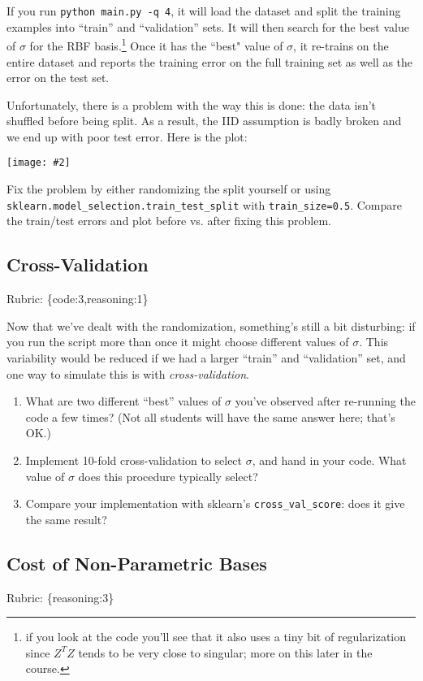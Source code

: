 \documentclass{article}
\def\rubric#1{\gre{Rubric: \{#1\}}}{}
\def\blu#1{{\color{blu}#1}}
\def\gre#1{{\color{gre}#1}}
\newcommand{\centerfig}[2]{\begin{center}\texttt{[image: \#2]}\end{center}}
\def\enum#1{\begin{enumerate}#1\end{enumerate}}
\begin{document}
If you run \verb|python main.py -q 4|, it will load the dataset and split the training examples
 into ``train'' and ``validation'' sets. It will then search for the best value of $\sigma$
 for the RBF basis.\footnote{if you look at the code you'll see that it also uses a tiny bit of regularization since $Z^TZ$ tends to be very close to singular; more on this later in the course.}
  Once it has the ``best" value of $\sigma$, it re-trains on the entire dataset and reports the
  training error on the full training set as well as the error on the test set.

Unfortunately, there is a problem with the way this is done: the data isn't shuffled before being split.
As a result, the IID assumption is badly broken and we end up with poor test error. Here is the plot:

\centerfig{.7}{../figs/least_squares_rbf_bad.pdf}


\blu{Fix the problem by either randomizing the split yourself or using \texttt{sklearn.model\_selection.train\_test\_split} with \texttt{train\_size=0.5}. Compare the train/test errors and plot before vs. after fixing this problem.}


\subsection{Cross-Validation}
\rubric{code:3,reasoning:1}

Now that we've dealt with the randomization, something's still a bit disturbing:
if you run the script more than once it might choose different values of $\sigma$.
This variability would be reduced if we
had a larger ``train'' and ``validation'' set, and one way to simulate this is
with \emph{cross-validation}. 

\blu{\enum{
\item What are two different ``best'' values of $\sigma$ you've observed after re-running the code a few times? (Not all students will have the same answer here; that's OK.)
\item Implement 10-fold cross-validation to select $\sigma$, and hand in your code. What value of $\sigma$ does this procedure typically select?
\item Compare your implementation with sklearn's \texttt{cross\_val\_score}: does it give the same result?
}}


\subsection{Cost of Non-Parametric Bases}
\rubric{reasoning:3}
\end{document}
